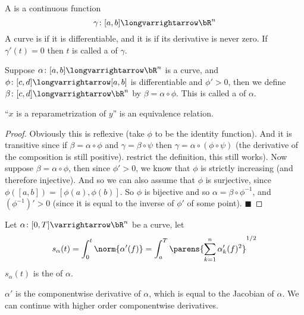 \documentclass[10pt]{article}
\let\to=\varrightarrow
\let\longto=\longvarrightarrow
\def\qed{%
    \ifmmode%
        \eqno\blacksquare%
    \else%
        \hskip1cm\allowbreak\hbox{}\nobreak\hfill$\blacksquare$%
    \fi%
}
\begin{document}
\begin{defn*}

    A  is a continuous function
    \[ \gamma\colon[a,b]\longto\bR^n \]
    A curve is  if it is differentiable, and it is  if its derivative is never zero.
    If $\gamma'(t)=0$ then $t$ is called a  of $\gamma$.

\end{defn*}

\begin{defn*}

    Suppose $\alpha\colon[a,b]\longto\bR^n$ is a curve, and $\phi\colon[c,d]\longto[a,b]$ is differentiable and $\phi'>0$, then we define $\beta\colon[c,d]\longto\bR^n$ by $\beta=\alpha\circ\phi$.
    This is called a  of $\alpha$.

\end{defn*}

\begin{prop*}

    ``$x$ is a reparametrization of $y$'' is an equivalence relation.

\end{prop*}

\begin{proof}

    Obviously this is reflexive (take $\phi$ to be the identity function).
    And it is transitive since if $\beta=\alpha\circ\phi$ and $\gamma=\beta\circ\psi$ then $\gamma=\alpha\circ(\phi\circ\psi)$ (the derivative of the composition is still positive).
    restrict the definition, this still works).
    Now suppose $\beta=\alpha\circ\phi$, then since $\phi'>0$, we know that $\phi$ is strictly increasing (and therefore injective).
    And so we can also assume that $\phi$ is surjective, since $\phi([a,b])=[\phi(a),\phi(b)]$.
    So $\phi$ is bijective and so $\alpha=\beta\circ\phi^{-1}$, and $(\phi^{-1})'>0$ (since it is equal to the inverse of $\phi'$ of some point).
    \qed

\end{proof}

\begin{defn*}

    Let $\alpha\colon[0,T]\to\bR^n$ be a curve, let
    \[ s_\alpha(t) = \int_0^t\norm{\alpha'(f)} = \int_a^T\parens{\sum_{k=1}^n\alpha_k'(f)^2}^{1/2} \]
    $s_\alpha(t)$ is the  of $\alpha$.

    $\alpha'$ is the componentwise derivative of $\alpha$, which is equal to the Jacobian of $\alpha$.
    We can continue with higher order componentwise derivatives.

\end{defn*}
\end{document}
